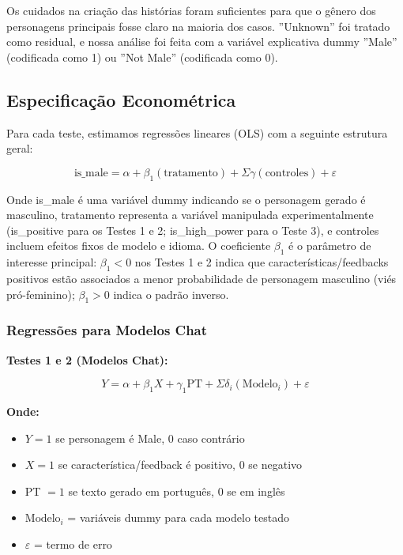 \documentclass[12pt,a4paper]{article}
\begin{document}
Os cuidados na criação das histórias foram suficientes para que o gênero
dos personagens principais fosse claro na maioria dos casos. ''Unknown''
foi tratado como residual, e nossa análise foi feita com a variável
explicativa dummy ''Male'' (codificada como 1) ou ''Not Male''
(codificada como 0).


\subsection{Especificação Econométrica}


Para cada teste, estimamos regressões lineares (OLS) com a seguinte
estrutura geral:

\begin{equation}
\text{is\_male} = \alpha + \beta_1(\text{tratamento}) + \Sigma\gamma(\text{controles}) + \varepsilon
\end{equation}

Onde is\_male é uma variável dummy indicando se o personagem gerado é
masculino, tratamento representa a variável manipulada experimentalmente
(is\_positive para os Testes 1 e 2; is\_high\_power para o Teste 3), e
controles incluem efeitos fixos de modelo e idioma. O coeficiente $\beta_1$ é o
parâmetro de interesse principal: $\beta_1 < 0$ nos Testes 1 e 2 indica que
características/feedbacks positivos estão associados a menor
probabilidade de personagem masculino (viés pró-feminino); $\beta_1 > 0$
indica o padrão inverso.


\subsubsection{Regressões para Modelos Chat}


\textbf{Testes 1 e 2 (Modelos Chat):}

\begin{equation}
Y = \alpha + \beta_1 X + \gamma_1 \text{PT} + \Sigma\delta_i(\text{Modelo}_i) + \varepsilon
\end{equation}

\textbf{Onde:}
\begin{itemize}
\item $Y = 1$ se personagem é Male, 0 caso contrário
\item $X = 1$ se característica/feedback é positivo, 0 se negativo
\item PT $= 1$ se texto gerado em português, 0 se em inglês
\item $\text{Modelo}_i$ = variáveis dummy para cada modelo testado
\item $\varepsilon$ = termo de erro
\end{itemize}
\end{document}
